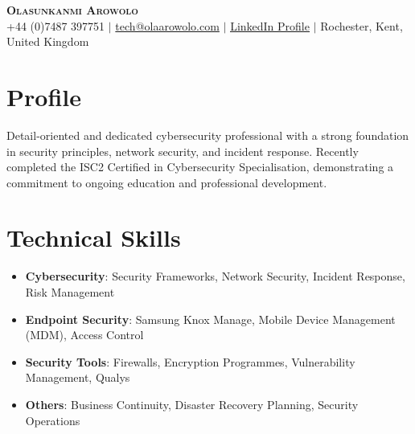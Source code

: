 \documentclass[a4paper,11pt]{article}
\newcommand{\resumeItem}[1]{
  \item\small{
    {#1 \vspace{-2pt}}
  }
}
\newcommand{\resumeItemListStart}{\begin{itemize}}
\newcommand{\resumeItemListEnd}{\end{itemize}\vspace{-5pt}}
\begin{document}

\begin{center}
    \textbf{\Huge \scshape Olasunkanmi Arowolo} \\ \vspace{1pt}
    \small +44 (0)7487 397751 $|$ \href{mailto:tech@olaarowolo.com}{{tech@olaarowolo.com}} $|$ 
    \href{https://www.linkedin.com/in/olasunkanmiarowolo/}{{\underline{LinkedIn Profile}}} $|$
    \small Rochester, Kent, United Kingdom
\end{center}

\section{Profile}
\begin{center}
\small{Detail-oriented and dedicated cybersecurity professional with a strong foundation in security principles, network security, and incident response. Recently completed the ISC2 Certified in Cybersecurity Specialisation, demonstrating a commitment to ongoing education and professional development.}
\end{center}

\section{Technical Skills}
    \resumeItemListStart
        \resumeItem{\textbf{Cybersecurity}{: Security Frameworks, Network Security, Incident Response, Risk Management}}
        \resumeItem{\textbf{Endpoint Security}{: Samsung Knox Manage, Mobile Device Management (MDM), Access Control}}
        \resumeItem{\textbf{Security Tools}{: Firewalls, Encryption Programmes, Vulnerability Management, Qualys}}
        \resumeItem{\textbf{Others}{: Business Continuity, Disaster Recovery Planning, Security Operations}}
\resumeItemListEnd
\end{document}
